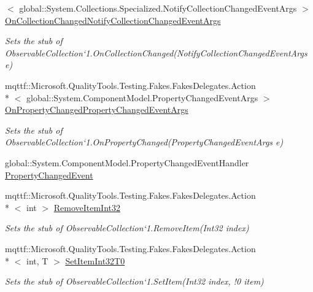 \begin{DoxyCompactItemize}
$<$ global\-::\-System.\-Collections.\-Specialized.\-Notify\-Collection\-Changed\-Event\-Args $>$ \hyperlink{class_system_1_1_collections_1_1_object_model_1_1_fakes_1_1_stub_observable_collection_3_01_t_01_4_af1f62d144b4248f0f9317b076f1d4677}{On\-Collection\-Changed\-Notify\-Collection\-Changed\-Event\-Args}
\begin{DoxyCompactList}\small\item\em Sets the stub of Observable\-Collection`1.On\-Collection\-Changed(\-Notify\-Collection\-Changed\-Event\-Args e)\end{DoxyCompactList}\item 
mqttf\-::\-Microsoft.\-Quality\-Tools.\-Testing.\-Fakes.\-Fakes\-Delegates.\-Action\\*
$<$ global\-::\-System.\-Component\-Model.\-Property\-Changed\-Event\-Args $>$ \hyperlink{class_system_1_1_collections_1_1_object_model_1_1_fakes_1_1_stub_observable_collection_3_01_t_01_4_a1645eb000c3f84647ccb69474e48811d}{On\-Property\-Changed\-Property\-Changed\-Event\-Args}
\begin{DoxyCompactList}\small\item\em Sets the stub of Observable\-Collection`1.On\-Property\-Changed(\-Property\-Changed\-Event\-Args e)\end{DoxyCompactList}\item 
global\-::\-System.\-Component\-Model.\-Property\-Changed\-Event\-Handler \hyperlink{class_system_1_1_collections_1_1_object_model_1_1_fakes_1_1_stub_observable_collection_3_01_t_01_4_a8a08998d262ff0bf0a6c322c7b38bf1c}{Property\-Changed\-Event}
\item 
mqttf\-::\-Microsoft.\-Quality\-Tools.\-Testing.\-Fakes.\-Fakes\-Delegates.\-Action\\*
$<$ int $>$ \hyperlink{class_system_1_1_collections_1_1_object_model_1_1_fakes_1_1_stub_observable_collection_3_01_t_01_4_aff4ad57067ce20177fc7ca4db6a4b80f}{Remove\-Item\-Int32}
\begin{DoxyCompactList}\small\item\em Sets the stub of Observable\-Collection`1.Remove\-Item(\-Int32 index)\end{DoxyCompactList}\item 
mqttf\-::\-Microsoft.\-Quality\-Tools.\-Testing.\-Fakes.\-Fakes\-Delegates.\-Action\\*
$<$ int, T $>$ \hyperlink{class_system_1_1_collections_1_1_object_model_1_1_fakes_1_1_stub_observable_collection_3_01_t_01_4_abc1342da426c3f1435f43a3448566827}{Set\-Item\-Int32\-T0}
\begin{DoxyCompactList}\small\item\em Sets the stub of Observable\-Collection`1.Set\-Item(Int32 index, !0 item)\end{DoxyCompactList}\end{DoxyCompactItemize}
